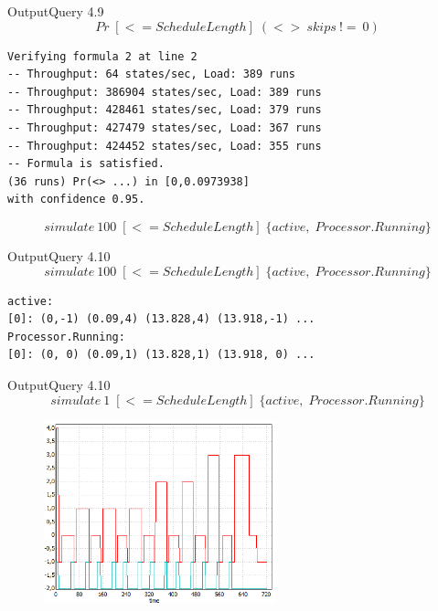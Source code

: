 \begin{frame}[fragile]{Output}{Query 4.9}
	\begin{equation*}
Pr\; [<=ScheduleLength] \; (<> \ skips \ !=\ 0)
	\end{equation*}
	\begin{lstlisting}
Verifying formula 2 at line 2
-- Throughput: 64 states/sec, Load: 389 runs
-- Throughput: 386904 states/sec, Load: 389 runs
-- Throughput: 428461 states/sec, Load: 379 runs
-- Throughput: 427479 states/sec, Load: 367 runs
-- Throughput: 424452 states/sec, Load: 355 runs
-- Formula is satisfied.
(36 runs) Pr(<> ...) in [0,0.0973938]
with confidence 0.95.
	\end{lstlisting}
	\pause
	\begin{equation*}
		simulate\ 100 \; [<=ScheduleLength] \; \{active, \; Processor.Running\}
	\end{equation*}
\end{frame}

\begin{frame}[fragile]{Output}{Query 4.10}
	\begin{equation*}
		simulate\ 100 \; [<=ScheduleLength] \; \{active, \; Processor.Running\}
	\end{equation*}
	\begin{lstlisting}
active:
[0]: (0,-1) (0.09,4) (13.828,4) (13.918,-1) ...
Processor.Running:
[0]: (0, 0) (0.09,1) (13.828,1) (13.918, 0) ...
	\end{lstlisting}
\end{frame}

\begin{frame}{Output}{Query 4.10}
	\begin{equation*}
		simulate\ 1 \; [<=ScheduleLength] \; \{active, \; Processor.Running\}
	\end{equation*}
	\begin{figure} %
		\includegraphics[width=0.6\textwidth]{graphics/activeprocessor.png}
		\end{figure}
\end{frame}

